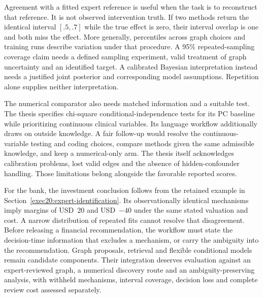 Agreement with a fitted expert reference is useful when the task is to
reconstruct that reference. It is not observed intervention truth. If two
methods return the identical interval $[.5,.7]$ while the true effect is zero,
their interval overlap is one and both miss the effect. More generally,
percentiles across graph choices and training runs describe variation under
that procedure. A 95\% repeated-sampling coverage claim needs a defined
sampling experiment, valid treatment of graph uncertainty and an identified
target. A calibrated Bayesian interpretation instead needs a justified joint
posterior and corresponding model assumptions. Repetition alone supplies
neither interpretation.

The numerical comparator also needs matched information and a suitable test.
The thesis specifies chi-square conditional-independence tests for its PC
baseline while prioritizing continuous clinical variables. Its language
workflow additionally draws on outside knowledge. A fair follow-up would
resolve the continuous-variable testing and coding choices, compare methods
given the same admissible knowledge, and keep a numerical-only arm. The
thesis itself acknowledges calibration problems, lost valid edges and the
absence of hidden-confounder handling. Those limitations belong alongside
the favorable reported scores. \citep{rel64molero}

For the bank, the investment conclusion follows from the retained example in
Section~\ref{exec20:expert-identification}. Its observationally identical
mechanisms imply margins of USD~20 and USD~$-40$ under the same stated
valuation and cost. A narrow distribution of repeated fits cannot resolve
that disagreement. Before releasing a financial recommendation, the workflow
must state the decision-time information that excludes a mechanism, or carry
the ambiguity into the recommendation. Graph proposals, retrieval and flexible
conditional models remain candidate components. Their integration deserves
evaluation against an expert-reviewed graph, a numerical discovery route and
an ambiguity-preserving analysis, with withheld mechanisms, interval coverage,
decision loss and complete review cost assessed separately.
